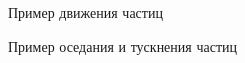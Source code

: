 \begin{figure}[ph!]
	\caption{Пример движения частиц}
	\label{fig:virus_move1}
\end{figure}

\begin{figure}[ph!]
	\caption{Пример оседания и тускнения частиц}
	\label{fig:virus_settled}
\end{figure}

